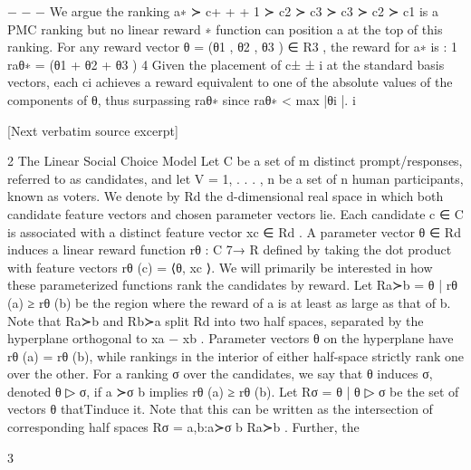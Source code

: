 \documentclass[10pt]{article}
\begin{document}
\begin{ReviewVerbatim}
                                                −   − −
We argue the ranking a∗ ≻ c+       +      +
                             1 ≻ c2 ≻ c3 ≻ c3 ≻ c2 ≻ c1 is a PMC ranking but no linear reward
                       ∗
function can position a at the top of this ranking.
For any reward vector θ = (θ1 , θ2 , θ3 ) ∈ R3 , the reward for a∗ is :
                                                     1
                                         raθ∗ =        (θ1 + θ2 + θ3 )
                                                     4
Given the placement of c±                                        ±
                          i at the standard basis vectors, each ci achieves a reward equivalent to one
of the absolute values of the components of θ, thus surpassing raθ∗ since
                                                  raθ∗ < max |θi |.
                                                             i


[Next verbatim source excerpt]

2     The Linear Social Choice Model
Let C be a set of m distinct prompt/responses, referred to as candidates, and let V = {1, . . . , n} be
a set of n human participants, known as voters. We denote by Rd the d-dimensional real space in
which both candidate feature vectors and chosen parameter vectors lie.
Each candidate c ∈ C is associated with a distinct feature vector xc ∈ Rd . A parameter vector
θ ∈ Rd induces a linear reward function rθ : C 7→ R defined by taking the dot product with feature
vectors rθ (c) = ⟨θ, xc ⟩. We will primarily be interested in how these parameterized functions rank
the candidates by reward. Let Ra≻b = {θ | rθ (a) ≥ rθ (b)} be the region where the reward of a is
at least as large as that of b. Note that Ra≻b and Rb≻a split Rd into two half spaces, separated by
the hyperplane orthogonal to xa − xb . Parameter vectors θ on the hyperplane have rθ (a) = rθ (b),
while rankings in the interior of either half-space strictly rank one over the other.
For a ranking σ over the candidates, we say that θ induces σ, denoted θ ▷ σ, if a ≻σ b implies
rθ (a) ≥ rθ (b). Let Rσ = {θ | θ ▷ σ} be the set of vectors θ thatTinduce it. Note that this can
be written as the intersection of corresponding half spaces Rσ = a,b:a≻σ b Ra≻b . Further, the


                                                    3


\end{ReviewVerbatim}
\end{document}

